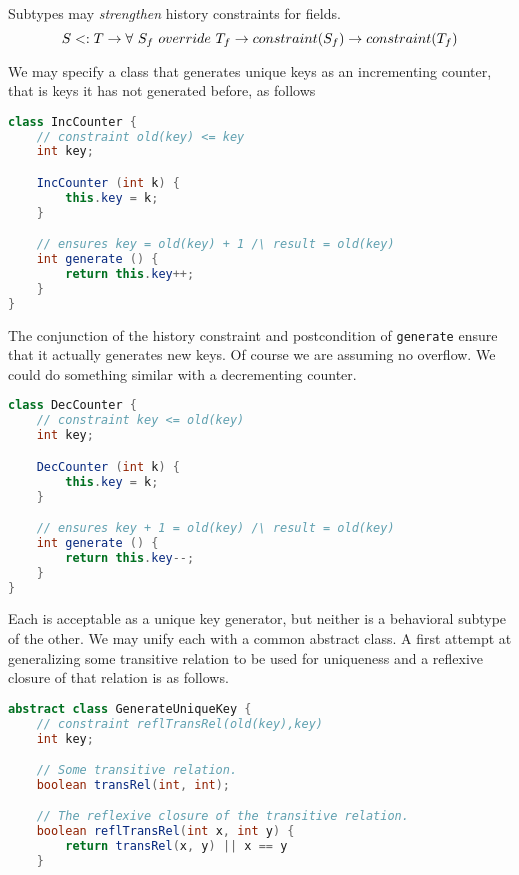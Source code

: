 \documentclass{article}
\begin{document}
\begin{definition}
Subtypes may \textit{strengthen} history constraints for fields.
\begin{equation}
S <: T \rightarrow \forall ~ S_f ~ override{} ~ T_f \rightarrow constraint(S_f) \rightarrow constraint(T_f)
\end{equation}
\end{definition}

\begin{example}
  We may specify a class that generates unique keys as an incrementing counter, that is keys it has not generated before, as follows
\begin{lstlisting}[language=Java, escapechar=|]
class IncCounter {
    // constraint old(key) <= key
    int key;

    IncCounter (int k) {
        this.key = k;
    }

    // ensures key = old(key) + 1 /\ result = old(key)
    int generate () {
        return this.key++;
    }
}
\end{lstlisting}
  The conjunction of the history constraint and postcondition of \texttt{generate} ensure that it actually generates new keys.
  Of course we are assuming no overflow.
  We could do something similar with a decrementing counter.
\begin{lstlisting}[language=Java, escapechar=|]
class DecCounter {
    // constraint key <= old(key)
    int key;

    DecCounter (int k) {
        this.key = k;
    }

    // ensures key + 1 = old(key) /\ result = old(key)
    int generate () {
        return this.key--;
    }
}
\end{lstlisting}
  Each is acceptable as a unique key generator, but neither is a behavioral subtype of the other.
  We may unify each with a common abstract class.
  A first attempt at generalizing some transitive relation to be used for uniqueness and a reflexive closure of that relation is as follows.
\begin{lstlisting}[language=Java, escapechar=|]
abstract class GenerateUniqueKey {
    // constraint reflTransRel(old(key),key)
    int key;

    // Some transitive relation.
    boolean transRel(int, int);

    // The reflexive closure of the transitive relation.
    boolean reflTransRel(int x, int y) {
        return transRel(x, y) || x == y
    }


\end{lstlisting}
\end{example}
\end{document}
